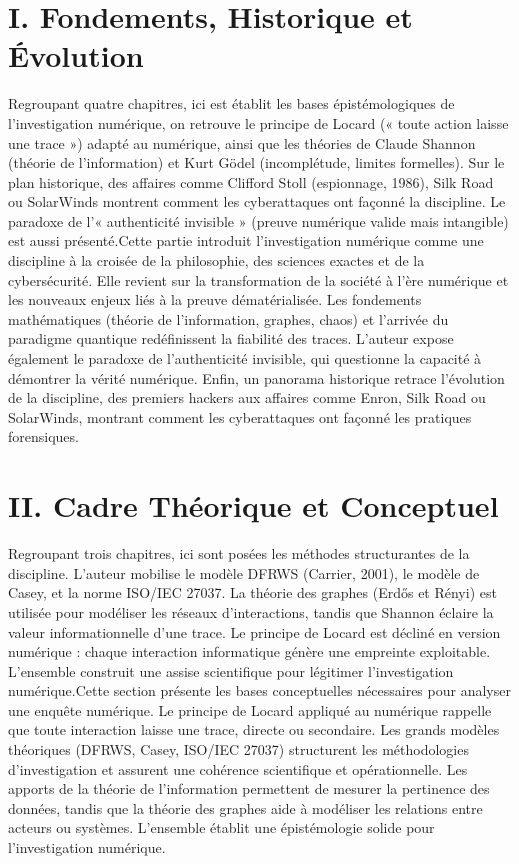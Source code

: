 \documentclass[12pt,a4paper]{article}
\begin{document}
	\section*{I. Fondements, Historique et Évolution}
	Regroupant quatre chapitres, ici est établit les bases épistémologiques de l’investigation numérique, on retrouve le principe de Locard (« toute action laisse une trace ») adapté au numérique, ainsi que les théories de Claude Shannon (théorie de l’information) et Kurt Gödel (incomplétude, limites formelles). Sur le plan historique, des affaires comme Clifford Stoll (espionnage, 1986), Silk Road ou SolarWinds montrent comment les cyberattaques ont façonné la discipline. Le paradoxe de l’« authenticité invisible » (preuve numérique valide mais intangible) est aussi présenté.Cette partie introduit l’investigation numérique comme une discipline à la croisée de la philosophie, des sciences exactes et de la cybersécurité. Elle revient sur la transformation de la société à l’ère numérique et les nouveaux enjeux liés à la preuve dématérialisée. Les fondements mathématiques (théorie de l’information, graphes, chaos) et l’arrivée du paradigme quantique redéfinissent la fiabilité des traces. L’auteur expose également le paradoxe de l’authenticité invisible, qui questionne la capacité à démontrer la vérité numérique. Enfin, un panorama historique retrace l’évolution de la discipline, des premiers hackers aux affaires comme Enron, Silk Road ou SolarWinds, montrant comment les cyberattaques ont façonné les pratiques forensiques.
	
	\section*{II. Cadre Théorique et Conceptuel}
	 Regroupant trois chapitres, ici sont posées les méthodes structurantes de la discipline. L’auteur mobilise le modèle DFRWS (Carrier, 2001), le modèle de Casey, et la norme ISO/IEC 27037. La théorie des graphes (Erdős et Rényi) est utilisée pour modéliser les réseaux d’interactions, tandis que Shannon éclaire la valeur informationnelle d’une trace. Le principe de Locard est décliné en version numérique : chaque interaction informatique génère une empreinte exploitable. L’ensemble construit une assise scientifique pour légitimer l’investigation numérique.Cette section présente les bases conceptuelles nécessaires pour analyser une enquête numérique. Le principe de Locard appliqué au numérique rappelle que toute interaction laisse une trace, directe ou secondaire. Les grands modèles théoriques (DFRWS, Casey, ISO/IEC 27037) structurent les méthodologies d’investigation et assurent une cohérence scientifique et opérationnelle. Les apports de la théorie de l’information permettent de mesurer la pertinence des données, tandis que la théorie des graphes aide à modéliser les relations entre acteurs ou systèmes. L’ensemble établit une épistémologie solide pour l’investigation numérique.
	
\end{document}
